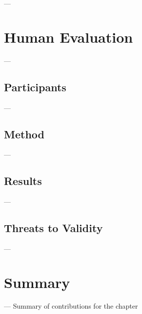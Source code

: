 ---  \vspace{3mm}

\section{Human Evaluation}

---  \vspace{3mm}

\subsection{Participants}

---  \vspace{3mm}

\subsection{Method}

---  \vspace{3mm}

\subsection{Results}

---  \vspace{3mm}

\subsection{Threats to Validity}

---  \vspace{3mm}

\section{Summary}

--- Summary of contributions for the chapter \vspace{3mm}